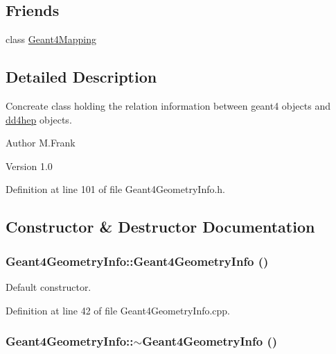 \subsection*{Friends}
\begin{DoxyCompactItemize}
\item 
class \hyperlink{class_d_d4hep_1_1_simulation_1_1_geant4_geometry_info_a1fe4b6e068c20a04fa1a7226219dac7c}{Geant4Mapping}
\end{DoxyCompactItemize}


\subsection{Detailed Description}
Concreate class holding the relation information between geant4 objects and \hyperlink{namespacedd4hep}{dd4hep} objects. \begin{DoxyAuthor}{Author}
M.Frank 
\end{DoxyAuthor}
\begin{DoxyVersion}{Version}
1.0 
\end{DoxyVersion}


Definition at line 101 of file Geant4GeometryInfo.h.

\subsection{Constructor \& Destructor Documentation}
\hypertarget{class_d_d4hep_1_1_simulation_1_1_geant4_geometry_info_a1da4666f8da102d02b986becb980dcb9}{
\subsubsection[{Geant4GeometryInfo}]{\setlength{\rightskip}{0pt plus 5cm}Geant4GeometryInfo::Geant4GeometryInfo ()}}
\label{class_d_d4hep_1_1_simulation_1_1_geant4_geometry_info_a1da4666f8da102d02b986becb980dcb9}


Default constructor. 

Definition at line 42 of file Geant4GeometryInfo.cpp.\hypertarget{class_d_d4hep_1_1_simulation_1_1_geant4_geometry_info_ab6da85b84ee74c106b5d4713dc5ccaef}{
\subsubsection[{$\sim$Geant4GeometryInfo}]{\setlength{\rightskip}{0pt plus 5cm}Geant4GeometryInfo::$\sim$Geant4GeometryInfo ()}}
\label{class_d_d4hep_1_1_simulation_1_1_geant4_geometry_info_ab6da85b84ee74c106b5d4713dc5ccaef}


